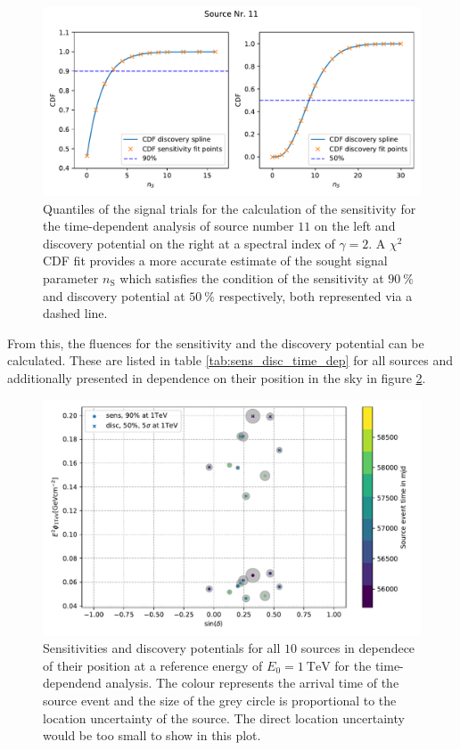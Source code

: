 \begin{figure}
    \centering
    \includegraphics[width=\linewidth]{Plots/05_csky/9_years_gfu_gold_time_dep_cdf_1.pdf}
    \caption{Quantiles of the signal trials for the calculation of the sensitivity for the time-dependent analysis of source number $\num{11}$ on the left and discovery potential on the right at a spectral index of $\gamma=\num{2}$. A $\chi^2$ CDF fit provides a more accurate estimate of the sought signal parameter $n_\text{S}$ which satisfies the condition of the sensitivity at $\SI{90}{\percent}$ and discovery potential at $\SI{50}{\percent}$ respectively, both represented via a dashed line.}
    \label{fig:time_dep_cdf_sens_disc_1}
\end{figure}
From this, the fluences for the sensitivity and the discovery potential can be calculated. These are listed in table \ref{tab:sens_disc_time_dep} for all sources and additionally presented in dependence on their position in the sky in figure \ref{fig:sens_disc_time_dep}.
\begin{figure}
    \centering
    \includegraphics[width=\linewidth]{Plots/05_csky/time_dep_sens_disc_dec_time.pdf}
    \caption{Sensitivities and discovery potentials for all $\num{10}$ sources in dependece of their position at a reference energy of $E_0 = \SI{1}{\tera\electronvolt}$ for the time-dependend analysis. The colour represents the arrival time of the source event and the size of the grey circle is proportional to the location uncertainty of the source. The direct location uncertainty would be too small to show in this plot.}
    \label{fig:sens_disc_time_dep}
\end{figure}
